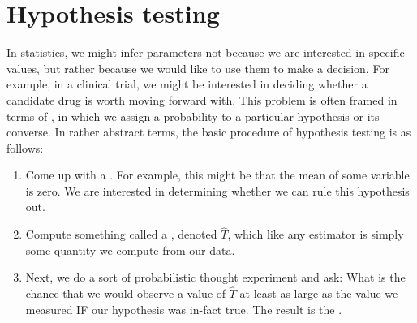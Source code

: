 %
%
%
%
%
%
%



\section{Hypothesis testing}
In statistics, we might infer parameters not because we are interested in specific values, but rather because we would like to use them to make a decision. For example, in a clinical trial, we might be interested in deciding whether a candidate drug is worth moving forward with. This problem is often framed in terms of , in which we assign a probability to a particular hypothesis or its converse. 
In rather abstract terms, the basic procedure of hypothesis testing is as follows:
\begin{enumerate}
\item Come up with a . For example, this might be that the mean of some variable is zero. We are interested in determining whether we can rule this hypothesis out. 
\item Compute something called a , denoted $\hat{T}$, which like any estimator is simply some quantity we compute from our data. 
\item Next, we do a sort of probabilistic thought experiment and ask: What is the chance that we would observe a value of $\hat{T}$ at least as large as the value we measured  IF our hypothesis was in-fact true.  The result is the . 
\end{enumerate}

